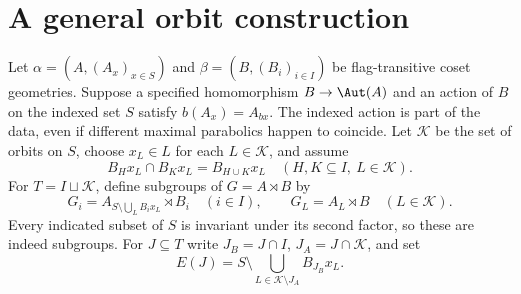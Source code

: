 \section{A general orbit construction}
Let $\alpha=(A,(A_x)_{x\in S})$ and
$\beta=(B,(B_i)_{i\in I})$ be flag-transitive coset geometries.
Suppose a specified homomorphism $B\to\Aut(A)$ and an action of $B$
on the indexed set $S$ satisfy $b(A_x)=A_{bx}$.
The indexed action is part of the data, even if different maximal
parabolics happen to coincide. Let $\mathcal K$ be the set of orbits
on $S$, choose $x_L\in L$ for each $L\in\mathcal K$, and assume
\begin{equation}\label{eq:general-orbits}
 B_Hx_L\cap B_Kx_L=B_{H\cup K}x_L
 \quad(H,K\subseteq I,\ L\in\mathcal K).
\end{equation}
For $T=I\sqcup\mathcal K$, define subgroups of $G=A\rtimes B$ by
\begin{equation}\label{eq:general-maximal}
 G_i=A_{S\setminus\bigcup_L B_ix_L}\rtimes B_i\quad(i\in I),
 \qquad G_L=A_L\rtimes B\quad(L\in\mathcal K).
\end{equation}
Every indicated subset of $S$ is invariant under its second factor,
so these are indeed subgroups. For $J\subseteq T$ write
$J_B=J\cap I$, $J_A=J\cap\mathcal K$, and set
\[
 E(J)=S\setminus\bigcup_{L\in\mathcal K\setminus J_A}B_{J_B}x_L.
\]


